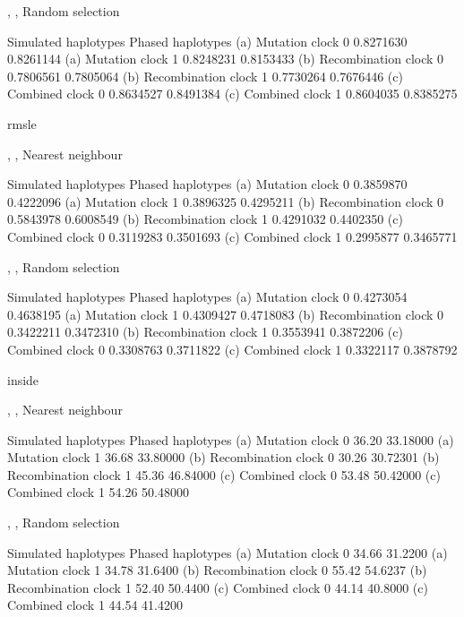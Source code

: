 , , Random selection

                           Simulated haplotypes  Phased haplotypes
(a) Mutation clock 0                   0.8271630         0.8261144
(a) Mutation clock 1                   0.8248231         0.8153433
(b) Recombination clock 0              0.7806561         0.7805064
(b) Recombination clock 1              0.7730264         0.7676446
(c) Combined clock 0                   0.8634527         0.8491384
(c) Combined clock 1                   0.8604035         0.8385275


rmsle

, , Nearest neighbour

                           Simulated haplotypes  Phased haplotypes
(a) Mutation clock 0                   0.3859870         0.4222096
(a) Mutation clock 1                   0.3896325         0.4295211
(b) Recombination clock 0              0.5843978         0.6008549
(b) Recombination clock 1              0.4291032         0.4402350
(c) Combined clock 0                   0.3119283         0.3501693
(c) Combined clock 1                   0.2995877         0.3465771

, , Random selection

                           Simulated haplotypes  Phased haplotypes
(a) Mutation clock 0                   0.4273054         0.4638195
(a) Mutation clock 1                   0.4309427         0.4718083
(b) Recombination clock 0              0.3422211         0.3472310
(b) Recombination clock 1              0.3553941         0.3872206
(c) Combined clock 0                   0.3308763         0.3711822
(c) Combined clock 1                   0.3322117         0.3878792


inside

, , Nearest neighbour

                           Simulated haplotypes  Phased haplotypes
(a) Mutation clock 0                       36.20          33.18000
(a) Mutation clock 1                       36.68          33.80000
(b) Recombination clock 0                  30.26          30.72301
(b) Recombination clock 1                  45.36          46.84000
(c) Combined clock 0                       53.48          50.42000
(c) Combined clock 1                       54.26          50.48000

, , Random selection

                           Simulated haplotypes  Phased haplotypes
(a) Mutation clock 0                       34.66           31.2200
(a) Mutation clock 1                       34.78           31.6400
(b) Recombination clock 0                  55.42           54.6237
(b) Recombination clock 1                  52.40           50.4400
(c) Combined clock 0                       44.14           40.8000
(c) Combined clock 1                       44.54           41.4200
